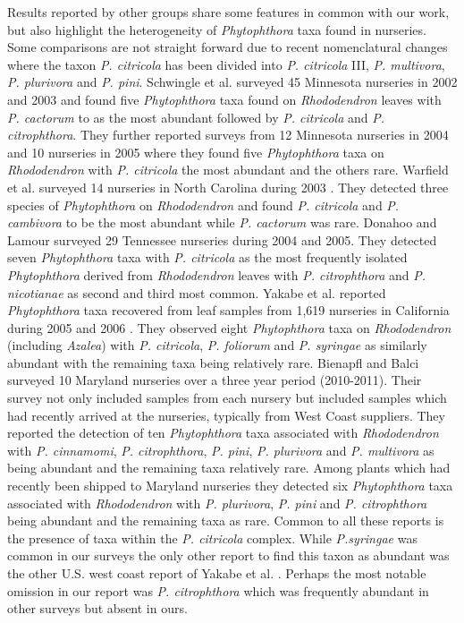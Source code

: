 \documentclass[12pt]{article}
\begin{document}
Results reported by other groups share some features in common with our work, but also highlight the heterogeneity of \emph{Phytophthora} taxa found in nurseries.  Some comparisons are not straight forward due to recent nomenclatural changes where the taxon \emph{P. citricola} has been divided into \emph{P. citricola} III, \emph{P. multivora}, \emph{P. plurivora}\cite{jung_burgess_2009} and \emph{P. pini}\cite{hong2011}.  Schwingle et al.\cite{schwingle_etal_2007} surveyed 45 Minnesota nurseries in 2002 and 2003 and found five \emph{Phytophthora} taxa found on \emph{Rhododendron} leaves with \emph{P. cactorum} to as the most abundant followed by \emph{P. citricola} and \emph{P. citrophthora}.  They further reported surveys from 12 Minnesota nurseries in 2004 and 10 nurseries in 2005 where they found five \emph{Phytophthora} taxa on \emph{Rhododendron} with \emph{P. citricola} the most abundant and the others rare.  Warfield et al. surveyed 14 nurseries in North Carolina during 2003 \cite{warfield_etal_2008}.  They detected three species of \emph{Phytophthora} on \emph{Rhododendron} and found \emph{P. citricola} and \emph{P. cambivora} to be the most abundant while \emph{P. cactorum} was rare.  Donahoo and Lamour surveyed 29 Tennessee nurseries during 2004 and 2005\cite{donahoo_lamour_2008}.  They detected seven \emph{Phytophthora} taxa with \emph{P. citricola} as the most frequently isolated \emph{Phytophthora} derived from \emph{Rhododendron} leaves with \emph{P. citrophthora} and \emph{P. nicotianae} as second and third most common.  Yakabe et al. reported \emph{Phytophthora} taxa recovered from leaf samples from 1,619 nurseries in California during 2005 and 2006 \cite{yakabe_etal_2009}.  They observed eight \emph{Phytophthora} taxa on \emph{Rhododendron} (including \emph{Azalea}) with \emph{P. citricola}, \emph{P. foliorum} and \emph{P. syringae} as similarly abundant with the remaining taxa being relatively rare.  Bienapfl and Balci \cite{bienapfl_balci_2013} surveyed 10 Maryland nurseries over a three year period (2010-2011).  Their survey not only included samples from each nursery but included samples which had recently arrived at the nurseries, typically from West Coast suppliers.  They reported the detection of ten \emph{Phytophthora} taxa associated with \emph{Rhododendron} with \emph{P. cinnamomi}, \emph{P. citrophthora}, \emph{P. pini}, \emph{P. plurivora} and \emph{P. multivora} as being abundant and the remaining taxa relatively rare.  Among plants which had recently been shipped to Maryland nurseries they detected six \emph{Phytophthora} taxa associated with \emph{Rhododendron} with \emph{P. plurivora}, \emph{P. pini} and \emph{P. citrophthora} being abundant and the remaining taxa as rare.  Common to all these reports is the presence of taxa within the \emph{P. citricola} complex.  While \emph{P.syringae} was common in our surveys the only other report to find this taxon as abundant was the other U.S. west coast report of Yakabe et al. \cite{yakabe_etal_2009}.  Perhaps the most notable omission in our report was \emph{P. citrophthora} which was frequently abundant in other surveys but absent in ours.
\end{document}
